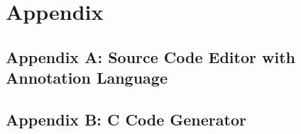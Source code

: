 \chapter{Appendix}
\section{Appendix A: Source Code Editor with Annotation Language}
  \label{Source_Code_Editor_in_Xtext}


\section{Appendix B: C Code Generator}	
	\label{C_Code_Generator_Xtend_Code_Snippet}
	
	

